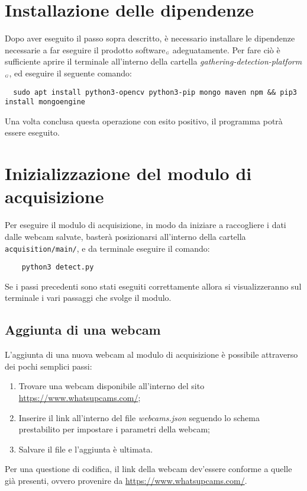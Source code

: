 \section{Installazione delle dipendenze}\label{ProceduraDiInstallazioneInstallazioneDipendenze}
Dopo aver eseguito il passo sopra descritto, è necessario installare le dipendenze necessarie a far eseguire il prodotto software$_{\scaleto{G}{3pt}}$ adeguatamente.
Per fare ciò è sufficiente aprire il terminale all'interno della cartella \textit{gathering-detection-platform$_{\scaleto{G}{3pt}}$}, ed eseguire il seguente comando:
\begin{lstlisting}
  sudo apt install python3-opencv python3-pip mongo maven npm && pip3 install mongoengine
\end{lstlisting}

Una volta conclusa questa operazione con esito positivo, il programma potrà essere eseguito.

\section{Inizializzazione del modulo di acquisizione}\label{ProceduraDiInstallazioneInizializzazioneModuloAcquisition}
Per eseguire il modulo di acquisizione, in modo da iniziare a raccogliere i dati dalle webcam salvate, basterà posizionarsi all'interno della cartella \texttt{acquisition/main/}, e da terminale eseguire il comando:
\begin{lstlisting}
    python3 detect.py
\end{lstlisting}
Se i passi precedenti sono stati eseguiti correttamente allora si visualizzeranno sul terminale i vari passaggi che svolge il modulo.

\subsection{Aggiunta di una webcam}
L'aggiunta di una nuova webcam al modulo di acquisizione è possibile attraverso dei pochi semplici passi:
\begin{enumerate}
	\item Trovare una webcam disponibile all'interno del sito \url{https://www.whatsupcams.com/};
	\item Inserire il link all'interno del file \textit{webcams.json} seguendo lo schema prestabilito per impostare i parametri della webcam;
	\item Salvare il file e l'aggiunta è ultimata.
\end{enumerate}
Per una questione di codifica, il link della webcam dev'essere conforme a quelle già presenti, ovvero provenire da \url{https://www.whatsupcams.com/}.



